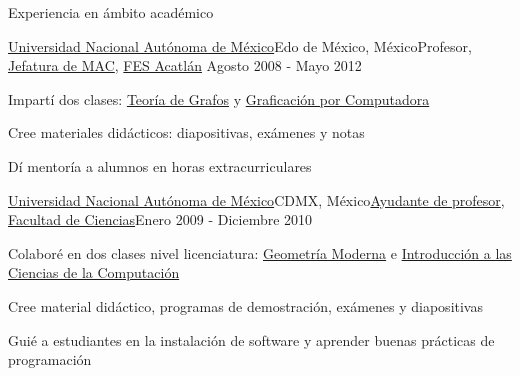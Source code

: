 \documentclass{resume} %
\begin{document}
\begin{rSection}{Experiencia en ámbito académico}
	\begin{rSubsection}{\href{http://www.unam.mx}{Universidad Nacional Autónoma de México}}{Edo de México, México}{Profesor, \href{http://www.mac.acatlan.unam.mx}{Jefatura de MAC}, \href{https://www.acatlan.unam.mx}{FES Acatlán}} {Agosto 2008 - Mayo 2012}
	\item Impartí dos clases: \href{https://www.acatlan.unam.mx/files/PlanesDeEstudio/MAC/4/Teoria_de_Graficas.pdf}{Teoría de Grafos} y \href{https://www.acatlan.unam.mx/files/PlanesDeEstudio/MAC/7/Graficacion_por_Computadora.pdf}{Graficación por Computadora}
	\item Cree materiales didácticos: diapositivas, exámenes y notas
	\item Dí mentoría a alumnos en horas extracurriculares
	\end{rSubsection}
	
	\begin{rSubsection}{\href{http://www.unam.mx}{Universidad Nacional Autónoma de México}}{CDMX, México}{\href{http://www.fciencias.unam.mx/directorio/63922}{Ayudante de profesor}, \href{http://www.fciencias.unam.mx/}{Facultad de Ciencias}}{Enero 2009 - Diciembre 2010}
	\item Colaboré en dos clases nivel licenciatura: \href{http://www.fciencias.unam.mx/licenciatura/asignaturas/217/249}{Geometría Moderna} e \href{http://www.fciencias.unam.mx/licenciatura/asignaturas/2017/1236}{Introducción a las Ciencias de la Computación}
	\item Cree material didáctico, programas de demostración, exámenes y diapositivas
	\item Guié a estudiantes en la instalación de software y aprender buenas prácticas de programación
	\end{rSubsection}

\end{rSection}
\end{document}
